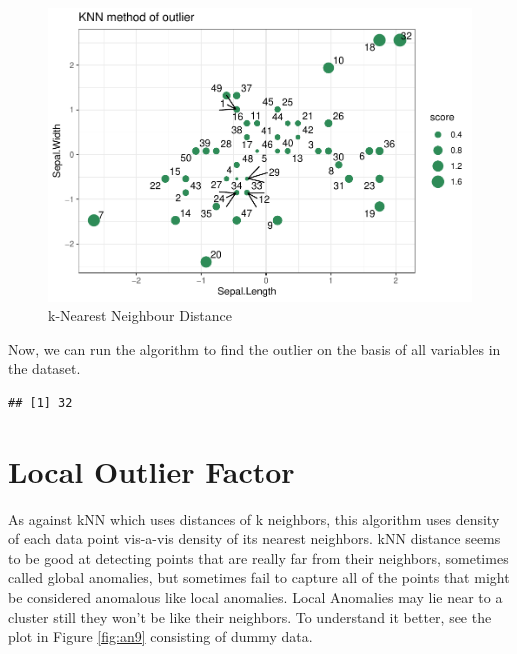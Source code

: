 \documentclass[
]{book}
\newenvironment{Shaded}{\begin{snugshade}}{\end{snugshade}}
\newcommand{\CommentTok}[1]{\textcolor[rgb]{0.56,0.35,0.01}{\textit{#1}}}
\newcommand{\DecValTok}[1]{\textcolor[rgb]{0.00,0.00,0.81}{#1}}
\newcommand{\FunctionTok}[1]{\textcolor[rgb]{0.13,0.29,0.53}{\textbf{#1}}}
\newcommand{\NormalTok}[1]{#1}
\newcommand{\OtherTok}[1]{\textcolor[rgb]{0.56,0.35,0.01}{#1}}
\newcommand{\SpecialCharTok}[1]{\textcolor[rgb]{0.81,0.36,0.00}{\textbf{#1}}}
\begin{document}
\begin{figure}

{\centering \includegraphics[height=0.28\textheight]{DauR_files/figure-latex/an8-1} 

}

\caption{k-Nearest Neighbour Distance}\label{fig:an8}
\end{figure}

Now, we can run the algorithm to find the outlier on the basis of all variables in the dataset.

\begin{Shaded}
\end{Shaded}

\begin{verbatim}
## [1] 32
\end{verbatim}

\hypertarget{local-outlier-factor}{%
\section{Local Outlier Factor}\label{local-outlier-factor}}

As against kNN which uses distances of k neighbors, this algorithm uses density of each data point vis-a-vis density of its nearest neighbors. kNN distance seems to be good at detecting points that are really far from their neighbors, sometimes called global anomalies, but sometimes fail to capture all of the points that might be considered anomalous like local anomalies. Local Anomalies may lie near to a cluster still they won't be like their neighbors. To understand it better, see the plot in Figure \ref{fig:an9} consisting of dummy data.
\end{document}
